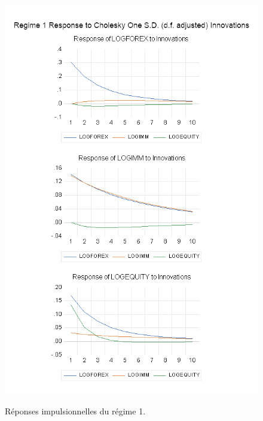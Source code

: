 \begin{figure}[H]
    \centering
    \caption{Réponses impulsionnelles du régime 1.}
    \includegraphics[scale=0.9]{annexes/regime_1_implusereponse.png}
    \label{fig:impulse_reponse_r1}
\end{figure}

